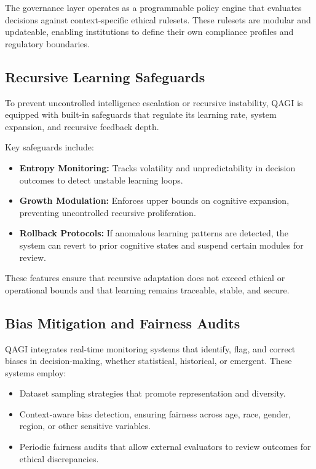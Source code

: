 \documentclass{article}
\theoremstyle{plain}
\theoremstyle{claimstyle}
\begin{document}
The governance layer operates as a programmable policy engine that evaluates decisions against context-specific ethical rulesets. These rulesets are modular and updateable, enabling institutions to define their own compliance profiles and regulatory boundaries.

\subsection{Recursive Learning Safeguards}

To prevent uncontrolled intelligence escalation or recursive instability, QAGI is equipped with built-in safeguards that regulate its learning rate, system expansion, and recursive feedback depth.

Key safeguards include:
\begin{itemize}
    \item \textbf{Entropy Monitoring:} Tracks volatility and unpredictability in decision outcomes to detect unstable learning loops.
    \item \textbf{Growth Modulation:} Enforces upper bounds on cognitive expansion, preventing uncontrolled recursive proliferation.
    \item \textbf{Rollback Protocols:} If anomalous learning patterns are detected, the system can revert to prior cognitive states and suspend certain modules for review.
\end{itemize}

These features ensure that recursive adaptation does not exceed ethical or operational bounds and that learning remains traceable, stable, and secure.

\subsection{Bias Mitigation and Fairness Audits}

QAGI integrates real-time monitoring systems that identify, flag, and correct biases in decision-making, whether statistical, historical, or emergent. These systems employ:
\begin{itemize}
    \item Dataset sampling strategies that promote representation and diversity.
    \item Context-aware bias detection, ensuring fairness across age, race, gender, region, or other sensitive variables.
    \item Periodic fairness audits that allow external evaluators to review outcomes for ethical discrepancies.
\end{itemize}
\end{document}
